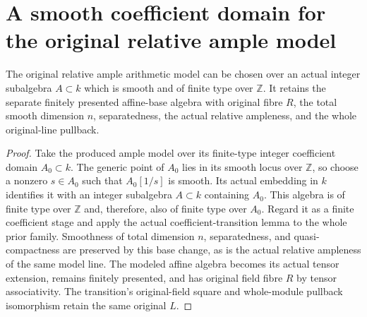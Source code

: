 \section{A smooth coefficient domain for the original relative ample model}

\begin{lemma}
\label{lem:kn-relative-arithmetic-smooth-ample-model}
\leanok
The original relative ample arithmetic model can be chosen over
an actual integer subalgebra $A\subset k$ which is smooth and
of finite type over $\mathbb Z$.  It retains the separate
finitely presented affine-base algebra with original fibre $R$,
the total smooth dimension $n$, separatedness, the actual
relative ampleness, and the whole original-line pullback.
\end{lemma}
\begin{proof}
Take the produced ample model over its finite-type integer
coefficient domain $A_0\subset k$.  The generic point of $A_0$
lies in its smooth locus over $\mathbb Z$, so choose a nonzero
$s\in A_0$ such that $A_0[1/s]$ is smooth.  Its actual embedding
in $k$ identifies it with an integer subalgebra $A\subset k$
containing $A_0$.  This algebra is of finite type over
$\mathbb Z$ and, therefore, also of finite type over $A_0$.
Regard it as a finite coefficient stage and apply the actual
coefficient-transition lemma to the whole prior family.
Smoothness of total dimension $n$, separatedness, and
quasi-compactness are preserved by this base change, as is the
actual relative ampleness of the same model line.  The modeled
affine algebra becomes its actual tensor extension, remains
finitely presented, and has original field fibre $R$ by tensor
associativity.  The transition's original-field square and
whole-module pullback isomorphism retain the same original $L$.
\end{proof}
